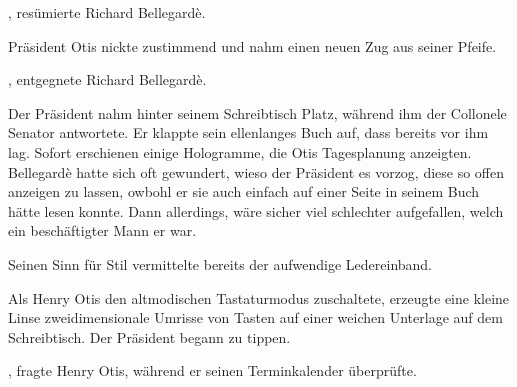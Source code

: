 \par

, resümierte Richard Bellegardè. 

\par

Präsident Otis nickte zustimmend und nahm einen neuen Zug aus seiner Pfeife. 

\par

, entgegnete Richard Bellegardè. 

\par

Der Präsident nahm hinter seinem Schreibtisch Platz, während ihm der Collonele Senator antwortete. Er klappte sein ellenlanges Buch auf, dass bereits vor ihm lag. Sofort erschienen einige Hologramme, die Otis Tagesplanung anzeigten. Bellegardè hatte sich oft gewundert, wieso der Präsident es vorzog, diese so offen anzeigen zu lassen, owbohl er sie auch einfach auf einer Seite in seinem Buch hätte lesen konnte. Dann allerdings, wäre sicher viel schlechter aufgefallen, welch ein beschäftigter Mann er war.

\par

Seinen Sinn für Stil vermittelte bereits der aufwendige Ledereinband.

\par

Als Henry Otis den altmodischen Tastaturmodus zuschaltete, erzeugte eine kleine Linse zweidimensionale Umrisse von Tasten auf einer weichen Unterlage auf dem Schreibtisch. Der Präsident begann zu tippen.

\par

, fragte Henry Otis, während er seinen Terminkalender überprüfte.

